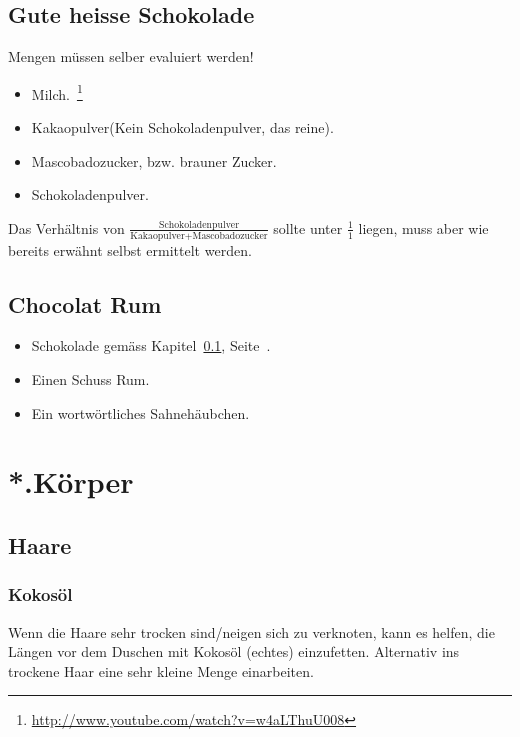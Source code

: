 \subsection{Gute heisse Schokolade}
\label{sec:hot_chocolate}
Mengen müssen selber evaluiert werden!
\begin{itemize}
	\item Milch.~\footnote{\url{http://www.youtube.com/watch?v=w4aLThuU008}}
	\item Kakaopulver(Kein Schokoladenpulver, das reine).
	\item Mascobadozucker, bzw. brauner Zucker.
	\item Schokoladenpulver.
\end{itemize}
Das Verhältnis von $\frac{\mbox{Schokoladenpulver}}{\mbox{Kakaopulver}+\mbox{Mascobadozucker}}$ sollte unter $\frac{1}{1}$ liegen, muss aber wie bereits erwähnt selbst ermittelt werden.
\subsection{Chocolat Rum}
\begin{itemize}
	\item Schokolade gemäss Kapitel~\ref{sec:hot_chocolate}, Seite~\pageref{sec:hot_chocolate}.
	\item Einen Schuss Rum.
	\item Ein wortwörtliches Sahnehäubchen.
\end{itemize}
\section{*.Körper}
\subsection{Haare}
\subsubsection{Kokosöl}
Wenn die Haare sehr trocken sind/neigen sich zu verknoten, kann es helfen, die Längen vor dem Duschen mit Kokosöl (echtes) einzufetten. Alternativ ins trockene Haar eine sehr kleine Menge einarbeiten.
